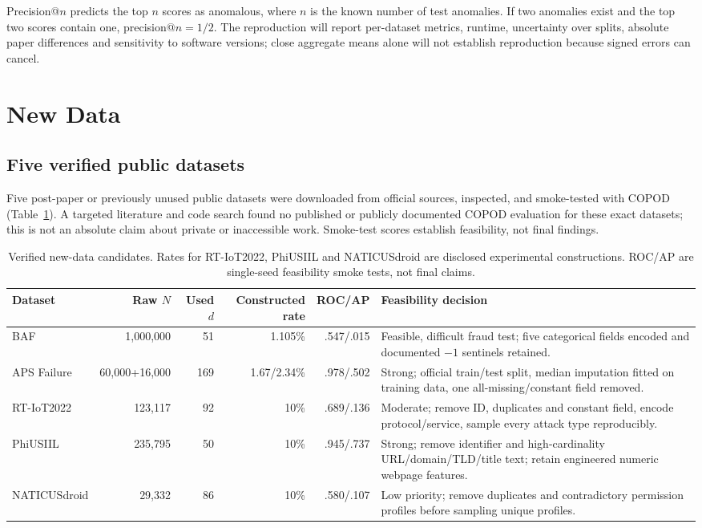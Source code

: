 \documentclass[11pt,a4paper,twocolumn]{article}
\begin{document}
Precision@$n$ predicts the top $n$ scores as anomalous, where $n$ is the known number of test anomalies. If two anomalies exist and the top two scores contain one, precision@$n=1/2$. The reproduction will report per-dataset metrics, runtime, uncertainty over splits, absolute paper differences and sensitivity to software versions; close aggregate means alone will not establish reproduction because signed errors can cancel.

\section{New Data}
\subsection{Five verified public datasets}

Five post-paper or previously unused public datasets were downloaded from official sources, inspected, and smoke-tested with COPOD (Table~\ref{tab:newdata}). A targeted literature and code search found no published or publicly documented COPOD evaluation for these exact datasets; this is not an absolute claim about private or inaccessible work. Smoke-test scores establish feasibility, not final findings.

\begin{table}[t]
\centering
\small
\setlength{\tabcolsep}{4pt}
\begin{tabularx}{\textwidth}{@{}lrrrrX@{}}
\toprule
Dataset & Raw $N$ & Used $d$ & Constructed rate & ROC/AP & Feasibility decision \\
\midrule
BAF & 1,000,000 & 51 & 1.105\% & .547/.015 & Feasible, difficult fraud test; five categorical fields encoded and documented $-1$ sentinels retained. \\
APS Failure & 60,000+16,000 & 169 & 1.67/2.34\% & .978/.502 & Strong; official train/test split, median imputation fitted on training data, one all-missing/constant field removed. \\
RT-IoT2022 & 123,117 & 92 & 10\% & .689/.136 & Moderate; remove ID, duplicates and constant field, encode protocol/service, sample every attack type reproducibly. \\
PhiUSIIL & 235,795 & 50 & 10\% & .945/.737 & Strong; remove identifier and high-cardinality URL/domain/TLD/title text; retain engineered numeric webpage features. \\
NATICUSdroid & 29,332 & 86 & 10\% & .580/.107 & Low priority; remove duplicates and contradictory permission profiles before sampling unique profiles. \\
\bottomrule
\end{tabularx}
\caption{Verified new-data candidates. Rates for RT-IoT2022, PhiUSIIL and NATICUSdroid are disclosed experimental constructions. ROC/AP are single-seed feasibility smoke tests, not final claims.}
\label{tab:newdata}
\end{table}
\end{document}
